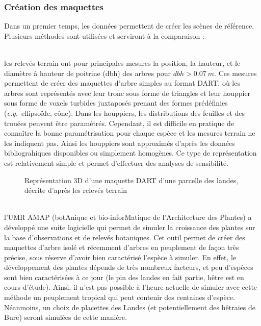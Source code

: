 \documentclass[a4paper,11pt]{article}
\newcommand{\eg}{\textit{e.g.}~}
\begin{document}
\subsubsection{Création des maquettes}
Dans un premier temps, les données permettent de créer les scènes de référence. Plusieurs méthodes sont utilisées et serviront à la comparaison :
\begin{description}
\setlength{\itemsep}{0.1cm}%
\item [Maquettes créées à partir des relevés traditionnels]\hfill \\ 
les relevés terrain ont pour principales mesures la position, la hauteur, et le diamètre à hauteur de poitrine (dbh) des arbres pour $dbh > 0.07~m$. Ces mesures permettent de créer des maquettes d'arbre simples au format DART, où les arbres sont représentés avec leur tronc sous forme de triangles et leur houppier sous forme de voxels turbides juxtaposés prenant des formes prédéfinies (\eg ellipsoïde, cône). Dans les houppiers, les distributions des feuilles et des trouées peuvent être paramétrés. Cependant, il est difficile en pratique de connaître la bonne paramétrisation pour chaque espèce et les mesures terrain ne les indiquent pas. Ainsi les houppiers sont approximés d'après les données bibliograhiques disponibles ou simplement homogènes. Ce type de représentation est relativement simple et permet d'effectuer des analyses de sensibilité.

\begin{figure}[!htpb]
\centering
{}
\caption{Représentation 3D d'une maquette DART d'une parcelle des landes, décrite d'après les relevés terrain}
\label{fig:maquetteDART}
\end{figure}

\item [Maquettes AMAP]\hfill \\ 
l'UMR AMAP (botAnique et bio-inforMatique de l'Architecture des Plantes) a développé une suite logicielle qui permet de simuler la croissance des plantes sur la base d'observations et de relevés  botaniques. Cet outil permet de créer des maquettes d'arbre isolé et récemment d'arbres en peuplement de façon très précise, sous réserve d'avoir bien caractérisé l'espèce à simuler. En effet, le développement des plantes dépends de très nombreux facteurs, et peu d'espèces sont bien caractérisées à ce jour (le pin des landes en fait partie, hêtre est en cours d'étude). Ainsi, il n'est pas possible à l'heure actuelle de simuler avec cette méthode un peuplement tropical qui peut contenir des centaines d'espèce. Néanmoins, un choix de placettes des Landes (et potentiellement des hêtraies de Bure) seront simulées de cette manière. 


\end{description}
\end{document}

